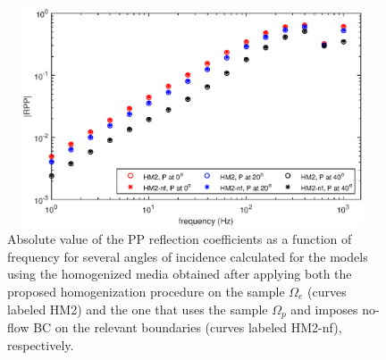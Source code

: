 \documentclass[draft]{agujournal2019}
\begin{document}
\begin{figure}[!ht]
\centering
        \includegraphics[width= 110mm, height=65mm]{Figure10.eps}
\caption{Absolute value of the PP reflection coefficients as a function of frequency for several angles of incidence calculated for the models using the homogenized media obtained after applying both the proposed homogenization procedure on the sample $\Omega_e$ (curves labeled HM2) and the one that uses the sample $\Omega_p$ and imposes no-flow BC on the relevant boundaries (curves labeled HM2-nf), respectively.}
\label{fig.10}
\end{figure}
\end{document}
